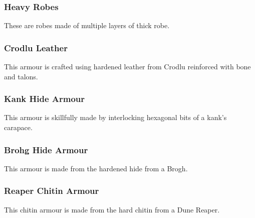\begin{multicols}{2}

\subsubsection{Heavy Robes}
\label{itmamr:heavyrobes}
These are robes made of multiple layers of thick robe.


\subsubsection{Crodlu Leather}
\label{itmamr:crodluleather}
This armour is crafted using hardened leather from Crodlu reinforced with bone and talons.


\subsubsection{Kank Hide Armour}
\label{itmamr:kankhide}
This armour is skillfully made by interlocking hexagonal bits of a kank’s carapace.

\subsubsection{Brohg Hide Armour}
\label{itmamr:brohghide}
This armour is made from the hardened hide from a Brogh.

\subsubsection{Reaper Chitin Armour}
\label{itmamr:reaperchitin}
This chitin armour is made from the hard chitin from a Dune Reaper.



\end{multicols}
